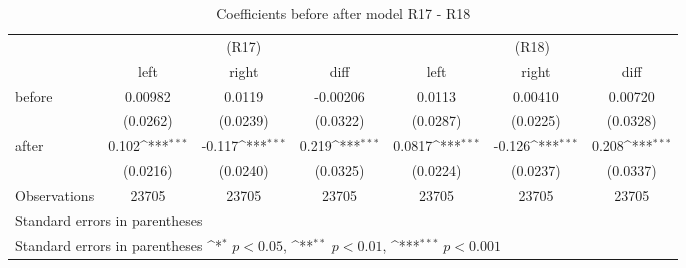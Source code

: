\begin{table}[!ht]\centering \footnotesize
\def\sym#1{\ifmmode^{#1}\else\(^{#1}\)\fi}
\caption{Coefficients before after model R17 - R18}
\begin{tabular}{l*{6}{c}}
\hline\hline
                    &\multicolumn{3}{c}{(R17)}&\multicolumn{3}{c}{(R18)}\\
&\multicolumn{1}{c}{left}&\multicolumn{1}{c}{right}&\multicolumn{1}{c}{diff}&\multicolumn{1}{c}{left}&\multicolumn{1}{c}{right}&\multicolumn{1}{c}{diff}\\
\hline
before              &     0.00982         &      0.0119         &    -0.00206         &      0.0113         &     0.00410         &     0.00720         \\
                    &    (0.0262)         &    (0.0239)         &    (0.0322)         &    (0.0287)         &    (0.0225)         &    (0.0328)         \\
[0.5em]
after               &       0.102\sym{***}&      -0.117\sym{***}&       0.219\sym{***}&      0.0817\sym{***}&      -0.126\sym{***}&       0.208\sym{***}\\
                    &    (0.0216)         &    (0.0240)         &    (0.0325)         &    (0.0224)         &    (0.0237)         &    (0.0337)         \\
\hline
Observations        &       23705         &       23705         &       23705         &       23705         &       23705         &       23705         \\
\hline\hline
\multicolumn{7}{l}{\footnotesize Standard errors in parentheses}\\
\multicolumn{7}{l}{ Standard errors in parentheses \sym{*} \(p<0.05\), \sym{**} \(p<0.01\), \sym{***} \(p<0.001\)}\\
\end{tabular}
\end{table}
